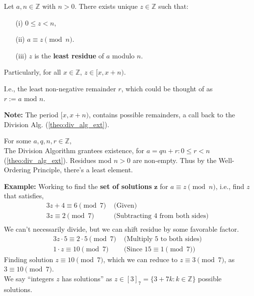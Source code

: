 \newpage

\begin{theo}

    Let \(a, n \in \mathbb{Z}\) with \(n > 0\). There exists unique $z \in \mathbb{Z}$ such that:
    \begin{itemize}
        \item [(i)] \(0 \leq z < n\),
        \item [(ii)] \(a \equiv z \pmod{n}\).
        \item [(iii)] \(z\) is the \textbf{least residue} of \(a\) modulo \(n\).
    \end{itemize}
    Particularly, for all $x\in\mathbb{Z}$, $z\in[x,x+n)$.
\end{theo}
I.e., the least non-negative remainder $r$, which could be thought of as $r:=a\text{ mod } n$.
\begin{Note}
    \textbf{Note:} The period $[x,x+n)$, contains possible remainders, a call back to the Division Alg. (\ref{theo:div_alg_ext}).
\end{Note}

\begin{Proof}

    For some $a,q,n,r\in\mathbb{Z}$,\\
    The Division Algorithm grantees existence, for $a=qn+r:0\leq r<n$ (\ref{theo:div_alg_ext}). Residues 
    mod $n>0$ are non-empty. Thus by the Well-Ordering Principle, there's a least element.
\end{Proof}

\noindent
\textbf{Example:} Working to find the \textbf{set of solutions} $\mathbf{z}$ for $a\equiv z\pmod{n}$, i.e., find $z$ that satisfies,
\begin{align*}
3z+4 \equiv 6 \pmod{7} & \text{ (Given)} \\
3z \equiv 2 \pmod{7} & \text{ (Subtracting 4 from both sides)} \\
\end{align*}
We can't necessarily divide, but we can shift residue by some favorable factor.
\begin{align*}
3z\cdot5 \equiv 2\cdot5 \pmod{7} & \text{ (Multiply 5 to both sides)} \\
1\cdot z\equiv 10 \pmod{7} & \text{ (Since $15\equiv1\pmod{7}$)} 
\end{align*}
Finding solution $z\equiv10\pmod{7}$, which we can reduce to $z\equiv 3\pmod{7}$, as $3\equiv10\pmod{7}$.\\
We say ``integers $z$ has solutions'' as $z\in[3]_{7}=\{3+7k:k\in\mathbb{Z}\}$ possible solutions.\\

